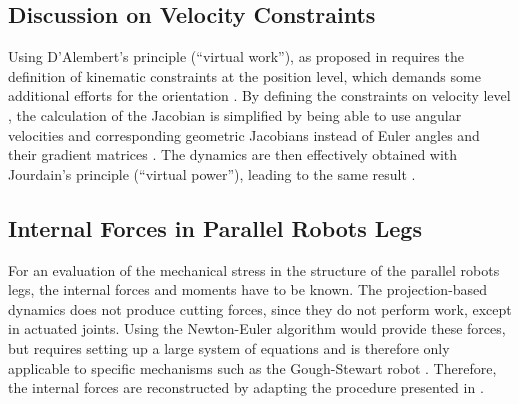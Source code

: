 \documentclass[fleqn,a4paper,10pt]{article}
\begin{document}
\begin{multicols}{2}
\subsection{Discussion on Velocity Constraints}

Using D'Alembert's principle (``virtual work''), as proposed in \cite{DoThanhKotHeiOrt2009b} requires the definition of kinematic constraints at the position level, which demands some additional efforts for the orientation \cite{SchapplerTapOrt2019c}.
By defining the constraints on velocity level \cite{Gogu2008}, the calculation of the Jacobian is simplified by being able to use angular velocities and corresponding geometric Jacobians instead of Euler angles and their gradient matrices \cite{SaminFis2013}.
The dynamics are then effectively obtained with Jourdain's principle (``virtual power''), leading to the same result \cite{SaminFis2013}.

\subsection{Internal Forces in Parallel Robots Legs}
\label{sec:intforce}

For an evaluation of the mechanical stress in the structure of the parallel robots legs, the internal forces and moments have to be known.
The projection-based dynamics does not produce cutting forces, since they do not perform work, except in actuated joints.
Using the Newton-Euler algorithm would provide these forces, but requires setting up a large system of equations and is therefore only applicable to specific mechanisms such as the Gough-Stewart robot \cite{Merlet2006}.
Therefore, the internal forces are reconstructed by adapting the procedure presented in \cite{KhalilGue2004}.



\end{multicols}
\end{document}
